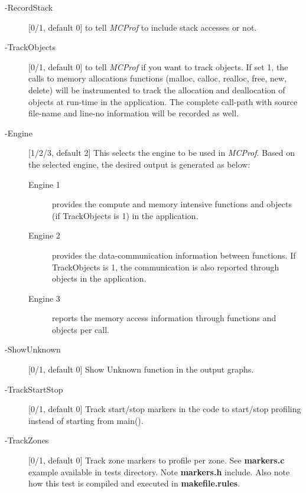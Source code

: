 \documentclass[11pt]{article}
\newcommand{\MCPROF}{\emph{MCProf}}
\begin{document}
\begin{description}

\item [-RecordStack] [0/1, default 0] to tell \MCPROF{} to include stack accesses or not.

\item [-TrackObjects] [0/1, default 0] to tell \MCPROF{} if you want to track objects. If
set 1, the calls to memory allocations functions (malloc, calloc, realloc,
free, new, delete) will be instrumented to track the allocation and deallocation of
objects at run-time in the application. The complete call-path with source
file-name and line-no information will be recorded as well.

\item [-Engine] [1/2/3, default 2] This selects the engine to be used in
    \MCPROF{}.  Based on the selected engine, the desired output is generated as
    below:

    \begin{description}

    \item [Engine 1]    provides the compute and memory intensive functions and
        objects (if TrackObjects is 1) in the application.

    \item [Engine 2]    provides the data-communication information between
        functions. If TrackObjects is 1, the communication is also reported
        through objects in the application.

    \item [Engine 3]    reports the memory access information through functions
        and objects per call.

    \end{description}

\item [-ShowUnknown]  [0/1, default 0] Show Unknown function in the output graphs.

\item [-TrackStartStop] [0/1, default 0] Track start/stop markers in the code to
    start/stop profiling instead of starting from main().

\item [-TrackZones] [0/1, default 0] Track zone markers to profile per zone. See
    \textbf{markers.c} example available in tests directory. Note \textbf{markers.h}
    include. Also note how this test is compiled and executed in \textbf{makefile.rules}.
    
\end{description}
\end{document}

